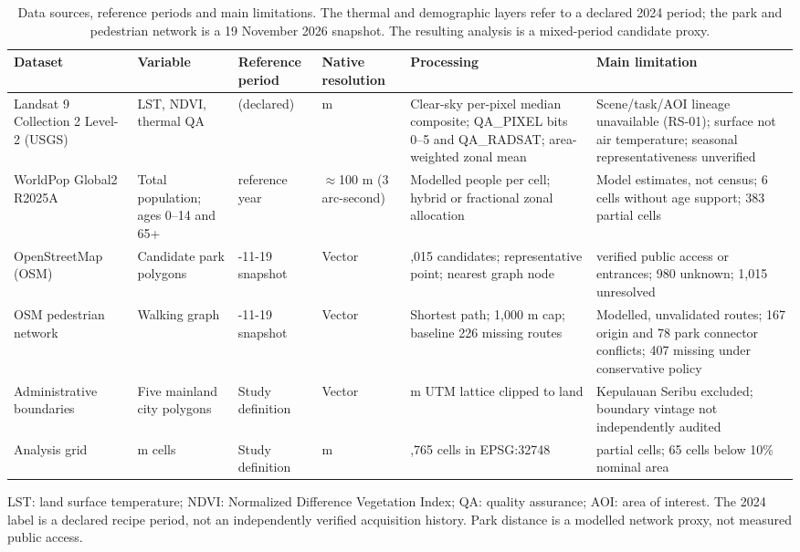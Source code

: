 \begin{table}[htbp]
\centering
\small
\caption{Data sources, reference periods and main limitations. The thermal and
demographic layers refer to a declared 2024 period; the park and pedestrian
network is a 19 November 2026 snapshot. The resulting analysis is a mixed-period
candidate proxy.}
\label{tab:sources}
\begin{threeparttable}
\begin{tabularx}{\textwidth}{@{}>{\raggedright\arraybackslash}p{2.6cm}
>{\raggedright\arraybackslash}p{3.1cm}
>{\raggedright\arraybackslash}p{1.5cm}
>{\raggedright\arraybackslash}p{1.4cm}
>{\raggedright\arraybackslash}X
>{\raggedright\arraybackslash}p{3.4cm}@{}}
\toprule
Dataset & Variable & Reference period & Native resolution & Processing & Main limitation \\
\midrule
Landsat 9 Collection 2 Level-2 (USGS) & LST, NDVI, thermal QA & 2024 (declared) & 30 m & Clear-sky per-pixel median composite; QA\_PIXEL bits 0--5 and QA\_RADSAT; area-weighted zonal mean & Scene/task/AOI lineage unavailable (RS-01); surface not air temperature; seasonal representativeness unverified \\
WorldPop Global2 R2025A & Total population; ages 0--14 and 65+ & 2024 reference year & $\approx$100 m (3 arc-second) & Modelled people per cell; hybrid or fractional zonal allocation & Model estimates, not census; 6 cells without age support; 383 partial cells \\
OpenStreetMap (OSM) & Candidate park polygons & 2026-11-19 snapshot & Vector & 1,015 candidates; representative point; nearest graph node & 0 verified public access or entrances; 980 unknown; 1,015 unresolved \\
OSM pedestrian network & Walking graph & 2026-11-19 snapshot & Vector & Shortest path; 1,000 m cap; baseline 226 missing routes & Modelled, unvalidated routes; 167 origin and 78 park connector conflicts; 407 missing under conservative policy \\
Administrative boundaries & Five mainland city polygons & Study definition & Vector & 500 m UTM lattice clipped to land & Kepulauan Seribu excluded; boundary vintage not independently audited \\
Analysis grid & 500 m cells & Study definition & 500 m & 2,765 cells in EPSG:32748 & 383 partial cells; 65 cells below 10\% nominal area \\
\bottomrule
\end{tabularx}
\begin{tablenotes}[flushleft]\footnotesize
\item LST: land surface temperature; NDVI: Normalized Difference Vegetation Index; QA: quality assurance; AOI: area of interest. The 2024 label is a declared recipe period, not an independently verified acquisition history. Park distance is a modelled network proxy, not measured public access.
\end{tablenotes}
\end{threeparttable}
\end{table}
